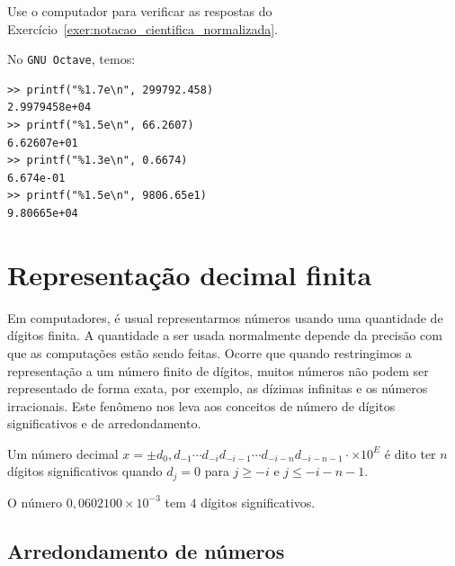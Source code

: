 \begin{exer}
  Use o computador para verificar as respostas do Exercício~\ref{exer:notacao_cientifica_normalizada}.
\end{exer}

\begin{resp}
No \verb+GNU Octave+, temos:
\begin{verbatim}
>> printf("%1.7e\n", 299792.458)
2.9979458e+04
>> printf("%1.5e\n", 66.2607)
6.62607e+01
>> printf("%1.3e\n", 0.6674)
6.674e-01
>> printf("%1.5e\n", 9806.65e1)
9.80665e+04
\end{verbatim}
\end{resp}


\section{Representação decimal finita}

Em computadores, é usual representarmos números usando uma quantidade de dígitos finita. A quantidade a ser usada normalmente depende da precisão com que as computações estão sendo feitas. Ocorre que quando restringimos a representação a um número finito de dígitos, muitos números não podem ser representado de forma exata, por exemplo, as dízimas infinitas e os números irracionais. Este fenômeno nos leva aos conceitos de número de dígitos significativos e de arredondamento.

\begin{defn} Um número decimal $x = \pm d_0,d_{-1}\cdots d_{-i}d_{-i-1}\cdots d_{-i-n} d_{-i-n-1}\cdot \times 10^E$ é dito ter $n$ dígitos significativos quando $d_{j}=0$ para $j\geq -i$ e $j\leq-i-n-1$.
\end{defn}

\begin{ex} O número $0,0602100\times 10^{-3}$ tem $4$ dígitos significativos.
\end{ex}

\subsection{Arredondamento de números}

